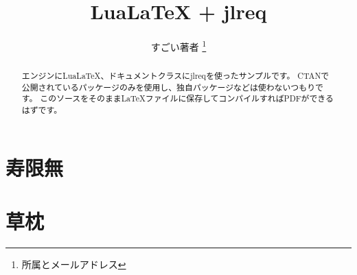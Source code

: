 \documentclass{jlreq}
\title{LuaLaTeX + jlreq}
\author{すごい著者 \thanks{所属とメールアドレス}}
\begin{document}
\maketitle

\begin{abstract}
エンジンにLuaLaTeX、ドキュメントクラスにjlreqを使ったサンプルです。
CTANで公開されているパッケージのみを使用し、独自パッケージなどは使わないつもりです。
このソースをそのままLaTeXファイルに保存してコンパイルすればPDFができるはずです。

\end{abstract}

\section{寿限無}


\section{草枕}


\newpage

\layout
\end{document}
